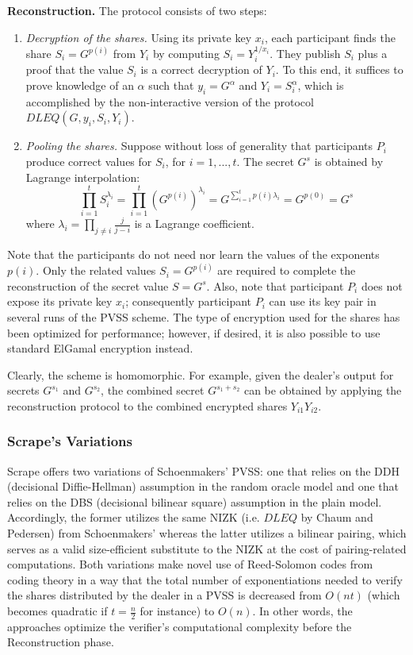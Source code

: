 \documentclass[11pt]{article}
\theoremstyle{definition}
\theoremstyle{remark}
\begin{document}
\textbf{Reconstruction.} The protocol consists of two steps:
\begin{enumerate}
\item \textit{Decryption of the shares.} Using its private key $x_i$, each participant finds the share $S_i = G^{p(i)}$ from $Y_i$ by computing $S_i = Y_i^{1 / x_i}$. They publish $S_i$ plus a proof that the value $S_i$ is a correct decryption of $Y_i$. To this end, it suffices to prove knowledge of an $\alpha$ such that $y_i = G^\alpha$ and $Y_i = S_i^\alpha$, which is accomplished by the non-interactive version of the protocol $DLEQ(G, y_i, S_i, Y_i)$.
\item \textit{Pooling the shares.} Suppose without loss of generality that participants $P_i$ produce correct values for $S_i$, for $i = 1, ..., t$. The secret $G^s$ is obtained by Lagrange interpolation:
$$\prod_{i = 1}^{t} S_i^{\lambda_i} = \prod_{i = 1}^{t} \left(G^{p(i)}\right)^{\lambda_i} = G^{\sum_{i = 1}^{t} p(i) \lambda_i} = G^{p(0)} = G^s$$
where $\lambda_i = \prod_{j \neq i} \frac{j}{j - i}$ is a Lagrange coefficient.
\end{enumerate}

Note that the participants do not need nor learn the values of the exponents $p(i)$. Only the related values $S_i = G^{p(i)}$ are required to complete the reconstruction of the secret value $S = G^s$. Also, note that participant $P_i$ does not expose its private key $x_i$; consequently participant $P_i$ can use its key pair in several runs of the PVSS scheme. The type of encryption used for the shares has been optimized for performance; however, if desired, it is also possible to use standard ElGamal encryption instead. 

Clearly, the scheme is homomorphic. For example, given the dealer's output for secrets $G^{s_1}$ and $G^{s_2}$, the combined secret $G^{s_1 + s_2}$ can be obtained by applying the reconstruction protocol to the combined encrypted shares $Y_{i1} Y_{i2}$.

\subsubsection{Scrape's Variations}
Scrape offers two variations of Schoenmakers' PVSS: one that relies on the DDH (decisional Diffie-Hellman) assumption in the random oracle model and one that relies on the DBS (decisional bilinear square) assumption in the plain model. Accordingly, the former utilizes the same NIZK (i.e. $DLEQ$ by Chaum and Pedersen) from Schoenmakers' whereas the latter utilizes a bilinear pairing, which serves as a valid size-efficient substitute to the NIZK at the cost of pairing-related computations. Both variations make novel use of Reed-Solomon codes from coding theory in a way that the total number of exponentiations needed to verify the shares distributed by the dealer in a PVSS is decreased from $O(n t)$ (which becomes quadratic if $t = \frac{n}{2}$ for instance) to $O(n)$. In other words, the approaches optimize the verifier's computational complexity before the Reconstruction phase.
\end{document}
